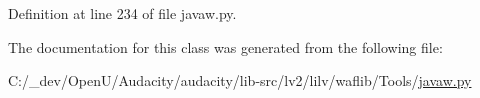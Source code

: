 Definition at line 234 of file javaw.\+py.



The documentation for this class was generated from the following file\+:\begin{DoxyCompactItemize}
\item 
C\+:/\+\_\+dev/\+Open\+U/\+Audacity/audacity/lib-\/src/lv2/lilv/waflib/\+Tools/\hyperlink{lilv_2waflib_2_tools_2javaw_8py}{javaw.\+py}\end{DoxyCompactItemize}

